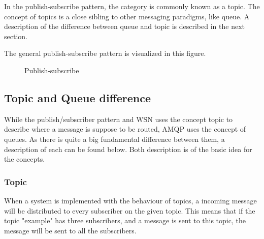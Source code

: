 In the publish-subscribe pattern, the category is commonly known as a topic. The concept of topics is a close sibling to other messaging paradigms, like queue. A description of the difference between queue and topic is described in the next section. 

The general publish-subscribe pattern is visualized in this figure.

\begin{center}
  \begin{figure}[ht]
    \caption{Publish-subscribe}
    \label{fig:publish-subscribe}
  \end{figure}
\end{center}

\subsection{Topic and Queue difference}
\label{subsec:architecture_and_implementation-topic_and_queue_differecnce}
While the publish/subscriber pattern and WSN uses the concept topic to describe where a message is suppose to be routed, AMQP uses the concept of queues. As there is quite a big fundamental difference between them, a description of each can be found below. Both description is of the basic idea for the concepts.

\subsubsection{Topic}
When a system is implemented with the behaviour of topics, a incoming message will be distributed to every subscriber on the given topic. This means that if the topic "example" has three subscribers, and a message is sent to this topic, the message will be sent to all the subscribers.

